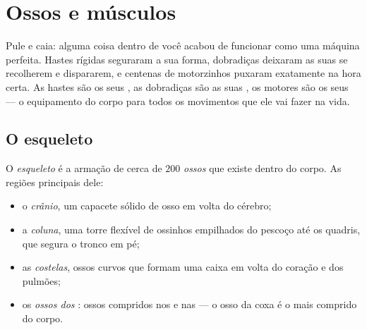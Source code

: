 \chapter{Ossos e músculos}\label{ch:g3:bones-and-muscles}

Pule e caia: alguma coisa dentro de você acabou de funcionar como
uma máquina perfeita. Hastes rígidas seguraram a sua forma,
dobradiças deixaram as suas  se recolherem e dispararem, e
centenas de motorzinhos puxaram exatamente na hora certa. As hastes
são os seus , as dobradiças são as suas , os
motores são os seus  --- o equipamento do corpo para todos
os movimentos que ele vai fazer na vida.

\section{O esqueleto}

\begin{definition}\label{def:g3:bones-and-muscles:skeleton}
O \emph{esqueleto} é a armação de cerca de $200$
\emph{ossos} que existe dentro do corpo. As regiões
principais dele:
\begin{itemize}
  \item o \emph{crânio}, um capacete sólido de osso em
        volta do cérebro;
  \item a \emph{coluna}, uma torre flexível
        de ossinhos empilhados do pescoço até os quadris, que segura
        o tronco em pé;
  \item as \emph{costelas}, ossos curvos que formam
        uma caixa em volta do coração e dos pulmões;
  \item os \emph{ossos dos }: ossos compridos nos  e
        nas  --- o osso da coxa é o mais comprido do corpo.
\end{itemize}
\end{definition}

